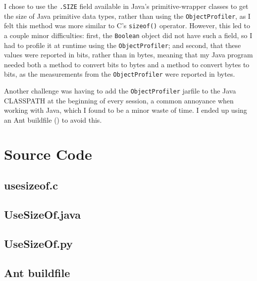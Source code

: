 \documentclass[12pt,letterpaper]{article}
\begin{document}
			I chose to use the \texttt{.SIZE} field available in Java's primitive-wrapper classes to get the size of Java primitive data types, rather than using the \texttt{ObjectProfiler}, as I felt this method was more similar to C's \texttt{sizeof()} operator. However, this led to a couple minor difficulties: first, the \texttt{Boolean} object did not have such a field, so I had to profile it at runtime using the \texttt{ObjectProfiler}; and second, that these values were reported in bits, rather than in bytes, meaning that my Java program needed both a method to convert bits to bytes and a method to convert bytes to bits, as the measurements from the \texttt{ObjectProfiler} were reported in bytes.
 
			Another challenge was having to add the \texttt{ObjectProfiler} jarfile to the Java CLASSPATH at the beginning of every session, a common annoyance when working with Java, which I found to be a minor waste of time. I ended up using an Ant buildfile () to avoid this.

	\appendix
		\section{Source Code}
			\label{ap:source}
			\subsection{usesizeof.c}
				
			\subsection{UseSizeOf.java}
				
			\subsection{UseSizeOf.py}
				
			\subsection{Ant buildfile}
				
\end{document}

